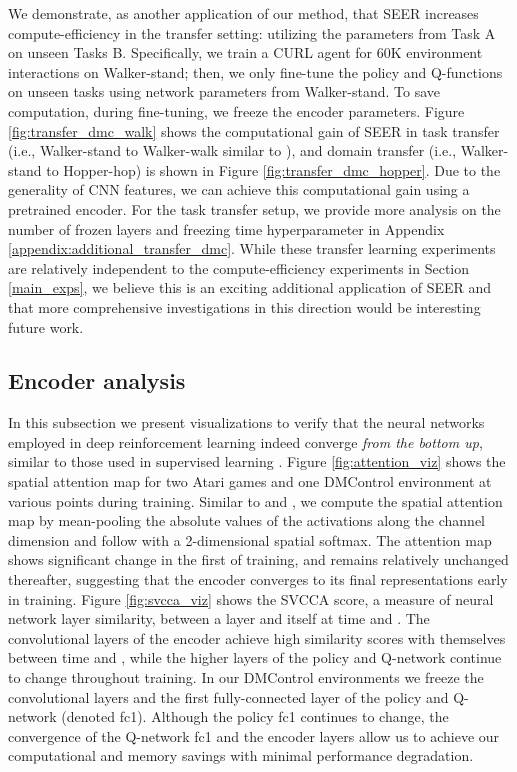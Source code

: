 \documentclass{article}
\begin{document}
We demonstrate, as another application of our method, that SEER increases compute-efficiency in the transfer setting: utilizing the parameters from Task A on unseen Tasks B.
Specifically,
we train a CURL agent for 60K environment interactions on Walker-stand; 
then, we only fine-tune the policy and Q-functions on unseen tasks using network parameters from Walker-stand.
To save computation, during fine-tuning, we freeze the encoder parameters.
Figure \ref{fig:transfer_dmc_walk} shows the computational gain of SEER in task transfer (i.e., Walker-stand to Walker-walk similar to \citet{yarats2019improving}), and domain transfer (i.e., Walker-stand to Hopper-hop) is shown in Figure \ref{fig:transfer_dmc_hopper}. Due to the generality of CNN features,
we can achieve this computational gain using a pretrained encoder.
For the task transfer setup, we provide more analysis on the number of frozen layers and freezing time hyperparameter  in Appendix \ref{appendix:additional_transfer_dmc}. 
While these transfer learning experiments are relatively independent to the compute-efficiency experiments in Section \ref{main_exps}, we believe this is an exciting additional application of SEER and that more comprehensive investigations in this direction would be interesting future work.

\subsection{Encoder analysis}

In this subsection we present visualizations to verify that the neural networks employed in deep reinforcement learning indeed converge {\em from the bottom up}, similar to those used in supervised learning \citep{46337}. 
Figure \ref{fig:attention_viz} shows the spatial attention map for two Atari games and one DMControl environment at various points during training. Similar to \citet{laskin2020reinforcement} and \citet{zagoruyko2016paying}, we compute the spatial attention map by mean-pooling the absolute values of
the activations along the channel dimension and follow with a 2-dimensional spatial softmax.
The attention map shows significant change in the first  of training, and remains relatively unchanged thereafter, suggesting that the encoder converges to its final representations early in training. Figure \ref{fig:svcca_viz} shows the SVCCA \citep{46337} score, a measure of neural network layer similarity, between a layer and itself at time  and . The convolutional layers of the encoder achieve high similarity scores with themselves between time  and , while the higher layers of the policy and Q-network continue to change throughout training. In our DMControl environments we freeze the convolutional layers and the first fully-connected layer of the policy and Q-network (denoted fc1). Although the policy fc1 continues to change, the convergence of the Q-network fc1 and the encoder layers allow us to achieve our computational and memory savings with minimal performance degradation.
\end{document}
